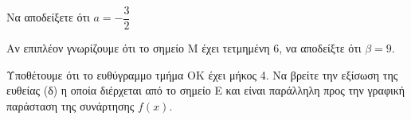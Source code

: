 \begin{alist}
\item Να αποδείξετε ότι $a = - \dfrac{3}{2}$
\item Αν επιπλέον γνωρίζουμε ότι το σημείο Μ έχει τετμημένη 6, να αποδείξτε ότι $\beta = 9$.
\item Υποθέτουμε ότι το ευθύγραμμο τμήμα ΟΚ έχει μήκος 4. Να βρείτε την εξίσωση της ευθείας (δ) η οποία διέρχεται από το σημείο Ε και είναι παράλληλη προς την γραφική παράσταση της συνάρτησης $f(x)$.
\end{alist}

